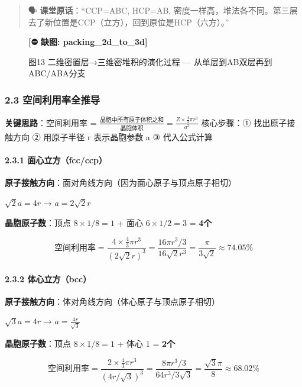 \documentclass[a4paper,11pt]{ctexart}
\begin{document}
\begin{quote}
🗣️ \textbf{课堂原话}：``CCP=ABC, HCP=AB, 密度一样高，堆法各不同。第三层去了新位置是CCP（立方），回到原位是HCP（六方）。''
\end{quote}

\begin{figure}[H]\centering
\textbf{[⛔ 缺图: packing_2d_to_3d]}
\caption{图13 二维密置层→三维密堆积的演化过程 — 从单层到AB双层再到ABC/ABA分支}
\end{figure}

\subsubsection{2.3 空间利用率全推导}\label{ux7a7aux95f4ux5229ux7528ux7387ux5168ux63a8ux5bfc}

\textbf{关键思路}：空间利用率 = \(\frac{\text{晶胞中所有原子体积之和}}{\text{晶胞体积}} = \frac{Z \times \frac{4}{3}\pi r^3}{a^3}\)
核心步骤：① 找出原子接触方向 ② 用原子半径 r 表示晶胞参数 a ③ 代入公式计算

\paragraph{2.3.1 面心立方（fcc/ccp）}\label{ux9762ux5fc3ux7acbux65b9fccccp}

\textbf{原子接触方向}：面对角线方向（因为面心原子与顶点原子相切）

\(\sqrt{2}a = 4r\) → \(a = 2\sqrt{2}r\)

\textbf{晶胞原子数}：顶点 \(8 \times 1/8 = 1\) + 面心 \(6 \times 1/2 = 3\) = \textbf{4个}

\[
\text{空间利用率} = \frac{4 \times \frac{4}{3}\pi r^3}{(2\sqrt{2}r)^3} = \frac{16\pi r^3 / 3}{16\sqrt{2}r^3} = \frac{\pi}{3\sqrt{2}} \approx 74.05\%
\]

\paragraph{2.3.2 体心立方（bcc）}\label{ux4f53ux5fc3ux7acbux65b9bcc}

\textbf{原子接触方向}：体对角线方向（体心原子与顶点原子相切）

\(\sqrt{3}a = 4r\) → \(a = \frac{4r}{\sqrt{3}}\)

\textbf{晶胞原子数}：顶点 \(8 \times 1/8 = 1\) + 体心 \(1\) = \textbf{2个}

\[
\text{空间利用率} = \frac{2 \times \frac{4}{3}\pi r^3}{(4r/\sqrt{3})^3} = \frac{8\pi r^3 / 3}{64r^3 / 3\sqrt{3}} = \frac{\sqrt{3}\pi}{8} \approx 68.02\%
\]
\end{document}
